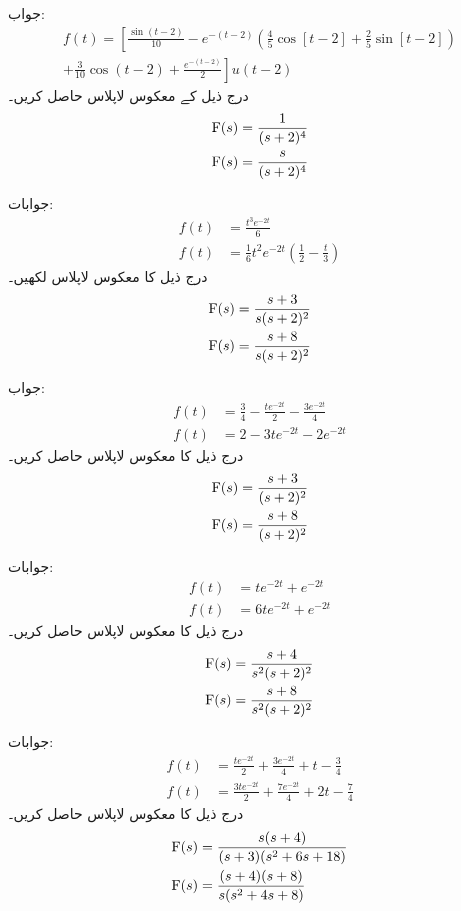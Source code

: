 جواب:
\begin{multline*}
f(t)=\left[\frac{\sin (t-2)}{10}-e^{-(t-2)} \left(\frac{4}{5}\cos [t-2]+\frac{2}{5}\sin [t-2]\right) \right.\\
\left.+\frac{3}{10}\cos (t-2)+\frac{e^{-(t-2)}}{2}\right]u(t-2)
\end{multline*}
درج ذیل کے معکوس لاپلاس حاصل کریں۔
\begin{align*}
{\ensuremath{{\textup{F}}}}(s)&=\frac{1}{(s+2)^4}\\
{{\textup{F}}}(s)&=\frac{s}{(s+2)^4}
\end{align*}

جوابات:
\begin{align*}
f(t)&=\frac{t^3 e^{-2t}}{6}\\
f(t)&=\frac{1}{6}t^2e^{-2t}\left(\frac{1}{2}-\frac{t}{3}\right)
\end{align*}
درج ذیل کا معکوس لاپلاس لکھیں۔
\begin{align*}
{\ensuremath{{\textup{F}}}}(s)&=\frac{s+3}{s(s+2)^2}\\
{{\textup{F}}}(s)&=\frac{s+8}{s(s+2)^2}
\end{align*}

جواب:
\begin{align*}
f(t)&=\frac{3}{4}-\frac{te^{-2t}}{2}-\frac{3e^{-2t}}{4}\\
f(t)&=2-3te^{-2t}-2e^{-2t}
\end{align*}
درج ذیل کا معکوس لاپلاس حاصل کریں۔
\begin{align*}
{\ensuremath{{\textup{F}}}}(s)&=\frac{s+3}{(s+2)^2}\\
{{\textup{F}}}(s)&=\frac{s+8}{(s+2)^2}
\end{align*}

جوابات:
\begin{align*}
f(t)&=te^{-2t}+e^{-2t}\\
f(t)&=6te^{-2t}+e^{-2t}
\end{align*}
درج ذیل کا معکوس لاپلاس حاصل کریں۔
\begin{align*}
{\ensuremath{{\textup{F}}}}(s)&=\frac{s+4}{s^2(s+2)^2}\\
{{\textup{F}}}(s)&=\frac{s+8}{s^2(s+2)^2}
\end{align*}

جوابات:
\begin{align*}
f(t)&=\frac{te^{-2t}}{2}+\frac{3e^{-2t}}{4}+t-\frac{3}{4}\\
f(t)&=\frac{3te^{-2t}}{2}+\frac{7e^{-2t}}{4}+2t-\frac{7}{4}
\end{align*}
درج ذیل کا معکوس لاپلاس حاصل کریں۔
\begin{align*}
{\ensuremath{{\textup{F}}}}(s)&=\frac{s(s+4)}{(s+3)(s^2+6s+18)}\\
{{\textup{F}}}(s)&=\frac{(s+4)(s+8)}{s(s^2+4s+8)}
\end{align*}


